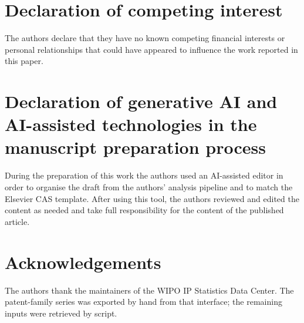 \documentclass[a4paper,fleqn]{cas-dc}
\begin{document}
\section*{Declaration of competing interest}

The authors declare that they have no known competing financial interests or
personal relationships that could have appeared to influence the work
reported in this paper.

\section*{Declaration of generative AI and AI-assisted technologies in the
manuscript preparation process}

During the preparation of this work the authors used an AI-assisted editor in
order to organise the draft from the authors' analysis pipeline and to match
the Elsevier CAS template. After using this tool, the authors reviewed and
edited the content as needed and take full responsibility for the content of
the published article.

\section*{Acknowledgements}

The authors thank the maintainers of the WIPO IP Statistics Data Center. The
patent-family series was exported by hand from that interface; the remaining
inputs were retrieved by script.

\printcredits



\end{document}
